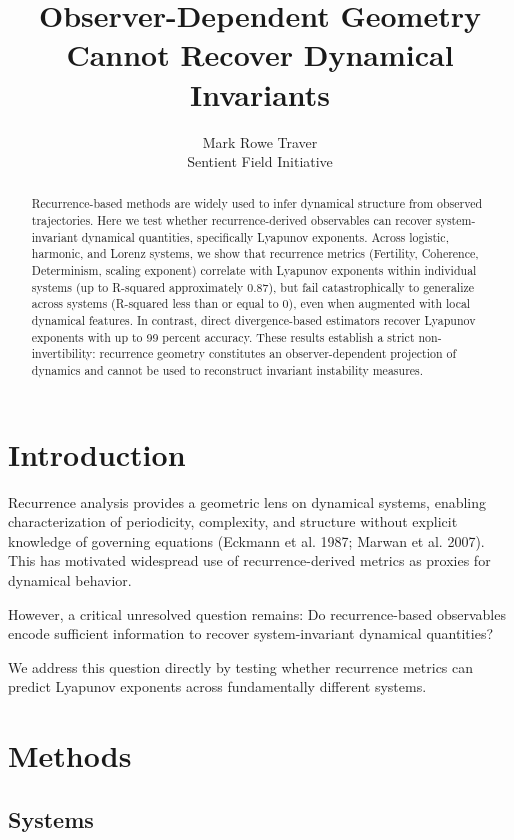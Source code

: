 \documentclass[11pt]{article}
\title{Observer-Dependent Geometry Cannot Recover Dynamical Invariants}
\author{Mark Rowe Traver \\ Sentient Field Initiative}
\date{}
\begin{document}
\maketitle

\begin{abstract}
	Recurrence-based methods are widely used to infer dynamical structure from observed trajectories. Here we test whether recurrence-derived observables can recover system-invariant dynamical quantities, specifically Lyapunov exponents. Across logistic, harmonic, and Lorenz systems, we show that recurrence metrics (Fertility, Coherence, Determinism, scaling exponent) correlate with Lyapunov exponents within individual systems (up to R-squared approximately 0.87), but fail catastrophically to generalize across systems (R-squared less than or equal to 0), even when augmented with local dynamical features. In contrast, direct divergence-based estimators recover Lyapunov exponents with up to 99 percent accuracy. These results establish a strict non-invertibility: recurrence geometry constitutes an observer-dependent projection of dynamics and cannot be used to reconstruct invariant instability measures.
\end{abstract}

\section{Introduction}

Recurrence analysis provides a geometric lens on dynamical systems, enabling characterization of periodicity, complexity, and structure without explicit knowledge of governing equations (Eckmann et al. 1987; Marwan et al. 2007). This has motivated widespread use of recurrence-derived metrics as proxies for dynamical behavior.

However, a critical unresolved question remains: Do recurrence-based observables encode sufficient information to recover system-invariant dynamical quantities?

We address this question directly by testing whether recurrence metrics can predict Lyapunov exponents across fundamentally different systems.

\section{Methods}

\subsection{Systems}
\end{document}
